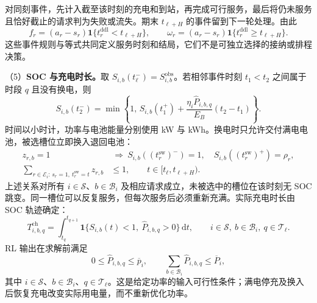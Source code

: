 \documentclass[12pt,a4paper,UTF8]{ctexart}
\begin{document}
对同刻事件，先计入截至该时刻的充电和到站，再完成可行服务，最后将仍未服务且恰好截止的请求判为失败或流失。期末 $t_{\ell+H}$ 的事件留到下一轮处理。由此
\begin{equation}
f_r=(a_r-s_r)\mathbf1\{t_r^{\mathrm{ddl}}<t_{\ell+H}\},
\qquad
\omega_r=(a_r-s_r)\mathbf1\{t_r^{\mathrm{ddl}}\ge t_{\ell+H}\}.
\label{eq:outcome_boundary}
\end{equation}
这些事件规则与等式共同定义服务时刻和结局，它们不是可独立选择的接纳或排程决策。

（5）\textbf{SOC 与充电时长。}取 $S_{i,b}(t_\ell^-)=S_{i,b}^{\mathrm{obs}}$。若相邻事件时刻 $t_1<t_2$ 之间属于时段 $q$ 且没有换电，则
\begin{equation}
S_{i,b}(t_2^-)=\min\left\{1,\,
S_{i,b}(t_1^+)+\frac{\eta_i\widehat P_{i,b,q}}{E_B}(t_2-t_1)\right\}.
\label{eq:event_charging_transition}
\end{equation}
时间以小时计，功率与电池能量分别使用 kW 与 kWh。换电时只允许交付满电电池，被选槽位立即换入退回电池：
\begin{equation}
\begin{aligned}
z_{r,b}=1&\ \Longrightarrow\
S_{i,b}((t_r^{\mathrm{sw}})^-)=1,\quad
S_{i,b}((t_r^{\mathrm{sw}})^+)=\rho_r,\\
\sum_{r\in\mathcal E_i:\,s_r=1,\ t_r^{\mathrm{sw}}=t}z_{r,b}&\le1,
\qquad t\in[t_\ell,t_{\ell+H}).
\end{aligned}
\label{eq:slot_matching}
\end{equation}
上述关系对所有 $i\in\mathcal S$、$b\in\mathcal B_i$ 及相应请求成立，未被选中的槽位在该时刻无 SOC 跳变。同一槽位可以反复服务，但每次服务后必须重新充满。实际充电时长由 SOC 轨迹确定：
\begin{equation}
T_{i,b,q}^{\mathrm{ch}}=\int_{t_q}^{t_{q+1}}
\mathbf1\{S_{i,b}(t)<1,\ \widehat P_{i,b,q}>0\}\,\mathrm dt,
\qquad i\in\mathcal S,\ b\in\mathcal B_i,\ q\in\mathcal T_\ell.
\label{eq:charging_duration}
\end{equation}
RL 输出在求解前满足
\begin{equation}
0\le\widehat P_{i,b,q}\le\overline p_i,
\qquad\sum_{b\in\mathcal B_i}\widehat P_{i,b,q}\le\overline P_i,
\label{eq:power_projection}
\end{equation}
其中 $i\in\mathcal S$、$b\in\mathcal B_i$、$q\in\mathcal T_\ell$。这是给定功率的输入可行性条件；满电停充及换入后恢复充电改变实际用电量，而不重新优化功率。
\end{document}
